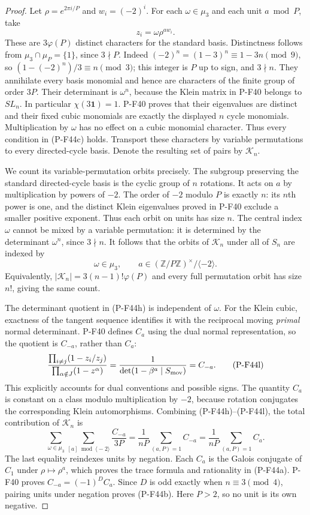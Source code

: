 \begin{proof}
Let $\rho=e^{2\pi i/P}$ and $w_i=(-2)^i$.
For each $\omega\in\mu_3$ and each unit $a\bmod P$, take
\[
                   z_i=\omega\rho^{a w_i}.
 \tag{P-F44j}
\]
These are $3\varphi(P)$ distinct characters for the
standard basis. Distinctness follows from
$\mu_3\cap\mu_P=\{1\}$, since $3\nmid P$.
Indeed $(-2)^n=(1-3)^n\equiv1-3n\pmod9$, so
$(1-(-2)^n)/3\equiv n\pmod3$; this integer is $P$
up to sign, and $3\nmid n$.
They annihilate every basis monomial and hence are
characters of the finite group of order $3P$.
Their determinant is $\omega^n$, because the Klein
matrix in P-F40 belongs to $SL_n$. In particular
$\chi(3\mathbf1)=1$.
P-F40 proves that their eigenvalues are distinct and
their fixed cubic monomials are exactly the displayed
$n$ cycle monomials. Multiplication by $\omega$ has no
effect on a cubic monomial character. Thus every
condition in (P-F44c) holds.
Transport these characters by variable permutations to
every directed-cycle basis. Denote the resulting set
of pairs by $\mathscr K_n$.

We count its variable-permutation orbits precisely.
The subgroup preserving the standard directed-cycle
basis is the cyclic group of $n$ rotations. It acts
on $a$ by multiplication by powers of $-2$.
The order of $-2$ modulo $P$ is exactly $n$: its
$n$th power is one, and the distinct Klein eigenvalues
proved in P-F40 exclude a smaller positive exponent.
Thus each orbit on units has size $n$.
The central index $\omega$ cannot be mixed by a variable
permutation: it is determined by the determinant
$\omega^n$, since $3\nmid n$.
It follows that the orbits of $\mathscr K_n$ under all
of $S_n$ are indexed by
\[
 \omega\in\mu_3,\qquad
 a\in(\mathbb Z/P\mathbb Z)^\times/\langle-2\rangle.
 \tag{P-F44k}
\]
Equivalently,
$|\mathscr K_n|=3(n-1)!\varphi(P)$ and every full
permutation orbit has size $n!$, giving the same count.

The determinant quotient in (P-F44h) is independent of
$\omega$. For the Klein cubic, exactness of the tangent
sequence identifies it with the reciprocal moving
\emph{primal} normal determinant. P-F40 defines $C_a$
using the dual normal representation, so the quotient
is $C_{-a}$, rather than $C_a$:
\[
 \frac{\prod_{i\ne j}(1-z_i/z_j)}
      {\prod_{\alpha\notin J}(1-z^\alpha)}
       =\frac1{\det(1-\beta^a\mid S_{\rm mov})}
       =C_{-a}.
 \tag{P-F44l}
\]
This explicitly accounts for dual conventions and
possible signs.
The quantity $C_a$ is constant on a class modulo
multiplication by $-2$, because rotation conjugates
the corresponding Klein automorphisms.
Combining (P-F44h)--(P-F44l), the total contribution
of $\mathscr K_n$ is
\[
 \sum_{\omega\in\mu_3}
 \sum_{[a]\bmod\langle-2\rangle}\frac{C_{-a}}{3P}
   =\frac1{nP}\sum_{(a,P)=1}C_{-a}
   =\frac1{nP}\sum_{(a,P)=1}C_a.
 \tag{P-F44m}
\]
The last equality reindexes units by negation.
Each $C_a$ is the Galois conjugate of $C_1$ under
$\rho\mapsto\rho^a$, which proves the trace formula
and rationality in (P-F44a).
P-F40 proves $C_{-a}=(-1)^D C_a$.
Since $D$ is odd exactly when $n\equiv3\pmod4$,
pairing units under negation proves (P-F44b).
Here $P>2$, so no unit is its own negative.


\end{proof}
